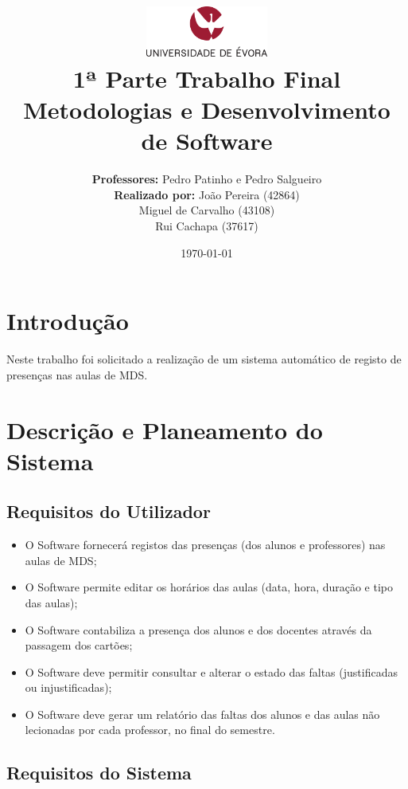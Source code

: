 \documentclass[11pt]{article}   %
\title
{
    \includegraphics[width=0.3\textwidth]{images/logo_universidade.png}
    \\[0.1cm]
    \textbf{1ª Parte Trabalho Final} \\
    Metodologias e Desenvolvimento de Software
}
\author
{
    \textbf{Professores:} Pedro Patinho e Pedro Salgueiro \\
    \textbf{Realizado por:} João Pereira (42864) \\ Miguel de Carvalho (43108) \\ Rui Cachapa (37617)
}
\date{\today}
\begin{document}
\maketitle

\section{Introdução} 

\hspace{0,5cm}Neste trabalho foi solicitado a realização de um sistema automático de registo de presenças nas aulas de MDS.

\section{Descrição e Planeamento do Sistema}

\subsection{Requisitos do Utilizador}

\begin{itemize}
    \item O Software fornecerá registos das presenças (dos alunos e professores) nas aulas de MDS; 
    \item O Software permite editar os horários das aulas (data, hora, duração e tipo das aulas);
    \item O Software contabiliza a presença dos alunos e dos docentes através da passagem dos cartões;
    \item O Software deve permitir consultar e alterar o estado das faltas (justificadas ou injustificadas);
    \item O Software deve gerar um relatório das faltas dos alunos e das aulas não lecionadas por cada professor, no final do semestre.
\end{itemize}

\subsection{Requisitos do Sistema}
\end{document}
